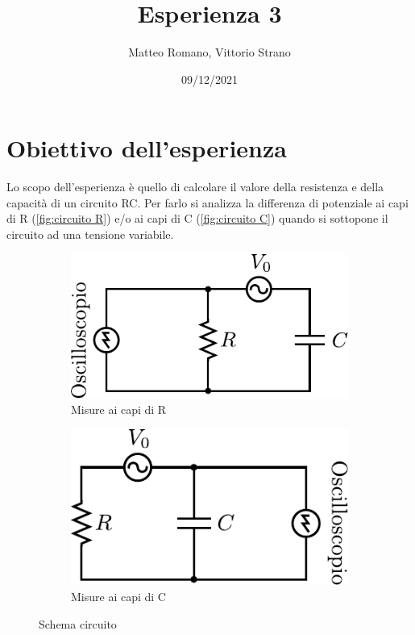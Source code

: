 \documentclass[11pt, a4paper]{article}
\title{Esperienza 3}
\author{Matteo Romano, Vittorio Strano}
\date{09/12/2021}
\numberwithin{equation}{section} %
\begin{document}
\maketitle

\tableofcontents

\section{Obiettivo dell'esperienza}

Lo scopo dell'esperienza è quello di calcolare il valore della resistenza e della capacità di un circuito RC. Per farlo si analizza la differenza di potenziale ai capi di R (\autoref{fig:circuito R}) e/o ai capi di C (\autoref{fig:circuito C}) quando si sottopone il circuito ad una tensione variabile.

\begin{figure}[ht!]
    \centering
    \begin{subfigure}[c]{.3\textwidth}
        \includegraphics[width=\textwidth]{circuito_osc_R.pdf}
        \caption{Misure ai capi di R}
        \label{fig:circuito R}
    \end{subfigure}
    \hspace{1in}
    \begin{subfigure}[c]{.3\textwidth}
        \includegraphics[width=\textwidth]{circuito_osc_C.pdf}
        \caption{Misure ai capi di C}
        \label{fig:circuito C}
    \end{subfigure}
    \caption{Schema circuito}
  \end{figure}
\end{document}
